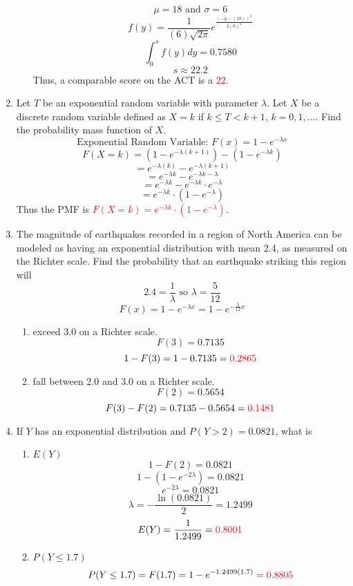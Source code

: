 \documentclass{article}
\begin{document}
\begin{enumerate}
\begin{enumerate}
\[            \mu = 18 \text{ and } \sigma = 6
        \]
        \[
            f(y)=\frac{1}{(6) \sqrt{2\pi}}e^{\frac{(-y-(18))^2}{2 (6)^2}}
        \]
        \[\int_{0}^{s}f(y)dy= 0.7580\]
        \[s \approx 22.2\]
        Thus, a comparable score on the ACT is a \textcolor{red}{$22$}.
    \end{enumerate}
    \item Let $T$ be an exponential random variable with parameter $\lambda$. Let $X$ be a discrete random variable defined as $X = k$ if $k \leq T < k + 1$, $k = 0, 1, . . .$. Find the probability mass function of $X$.
    \[
    \text{Exponential Random Variable: }F(x)=1-e^{-\lambda x}
    \]
    \[
    F(X=k)=(1-e^{-\lambda (k+1)})-(1-e^{-\lambda k})
    \]
    \[
    =e^{-\lambda (k)}-e^{-\lambda (k+1)}
    \]
    \[
    =e^{-\lambda k}-e^{-\lambda k-\lambda}
    \]
    \[
    =e^{-\lambda k}-e^{-\lambda k}\cdot e^{-\lambda}
    \]
    \[
    =e^{-\lambda k}\cdot(1- e^{-\lambda})
    \]
    Thus the PMF is \textcolor{red}{$F(X=k)=e^{-\lambda k}\cdot(1- e^{-\lambda})$}.
\pagebreak 
    \item The magnitude of earthquakes recorded in a region of North America can be modeled as having an exponential distribution with mean 2.4, as measured on the Richter scale. Find the probability that an earthquake striking this region will
    \[2.4=\frac{1}{\lambda} \text{ so } \lambda = \frac{5}{12}\]
    \[F(x)=1-e^{-\lambda x}=1-e^{-\frac{5}{12}x}\]
    \begin{enumerate}
        \item exceed 3.0 on a Richter scale.
        \[
            F(3)=0.7135
        \]
        \[
            1-F(3)=1-0.7135=\textcolor{red}{0.2865}
        \]
        \item fall between 2.0 and 3.0 on a Richter scale.
        \[
            F(2)=0.5654
        \]
        \[
            F(3)-F(2)=0.7135-0.5654=\textcolor{red}{0.1481}
        \]
    \end{enumerate}
    \item If $Y$ has an exponential distribution and $P (Y > 2) = 0.0821$, what is
    \begin{enumerate}
        \item $E(Y)$
        \[1-F(2)=0.0821\]
        \[1-(1-e^{-2\lambda})=0.0821\]
        \[e^{-2\lambda}=0.0821\]
        \[\lambda=-\frac{\ln(0.0821)}{2}=1.2499\]
        \[E(Y)=\frac{1}{1.2499}=\textcolor{red}{0.8001}\]
        \item $P(Y \leq 1.7)$
        \[P(Y \leq 1.7)=F(1.7)=1-e^{-{1.2499(1.7)}}=\textcolor{red}{0.8805}\]
    \end{enumerate}
\end{enumerate}
\end{document}
